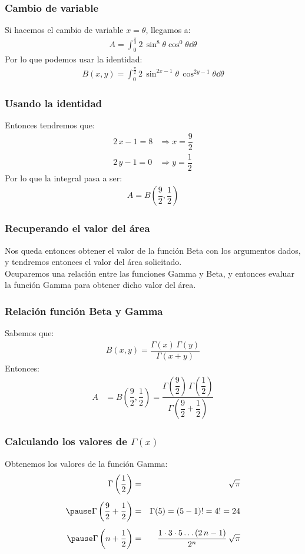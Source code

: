 \begin{frame}
\frametitle{Cambio de variable}
Si hacemos el cambio de variable $x = \theta$, llegamos a:
\begin{align*}
A = \int_{0}^{\frac{\pi}{2}} 2 \, \sin^{8} \theta \cos^{0} \theta \dd{\theta}
\end{align*}
\pause
Por lo que podemos usar la identidad:
\begin{align*}
B(x, y) = \int_{0}^\frac{\pi}{2} 2 \, \sin^{2x-1} \theta \, \cos^{2y-1} \theta \dd{\theta}
\end{align*}
\end{frame}
\begin{frame}
\frametitle{Usando la identidad}
Entonces tendremos que:
\begin{align*}
2 \, x - 1 = 8 &\Rightarrow x = \dfrac{9}{2} \\[0.5em]
2 \, y - 1 = 0 &\Rightarrow y = \dfrac{1}{2}
\end{align*}
\pause
Por lo que la integral pasa a ser:
\begin{align*}
A = B \left( \dfrac{9}{2},\dfrac{1}{2} \right)
\end{align*}
\end{frame}
\begin{frame}
\frametitle{Recuperando el valor del área}
Nos queda entonces obtener el valor de la función Beta con los argumentos dados, y tendremos entonces el valor del área solicitado.
\\
\bigskip
\pause
Ocuparemos una relación entre las funciones Gamma y Beta, y entonces evaluar la función Gamma para obtener dicho valor del área.
\end{frame}
\begin{frame}
\frametitle{Relación función Beta y Gamma}
Sabemos que:
\begin{align*}
B (x, y) = \dfrac{\Gamma (x) \, \Gamma (y)}{\Gamma (x + y)}
\end{align*}
\pause
Entonces:
\begin{align*}
A &= B \left( \dfrac{9}{2},\dfrac{1}{2} \right) = \dfrac{\Gamma \left(\dfrac{9}{2} \right) \, \Gamma \left(\dfrac{1}{2} \right)}{\Gamma \left(\dfrac{9}{2} + \dfrac{1}{2} \right)}
\end{align*}
\end{frame}
\begin{frame}
\frametitle{Calculando los valores de $\Gamma(x)$}
Obtenemos los valores de la función Gamma:
\begin{eqnarray*}
\Gamma \left( \dfrac{1}{2} \right) &=& \sqrt{\pi} \\[0.5em] \pause
\Gamma \left( \dfrac{9}{2} + \dfrac{1}{2} \right) &=& \Gamma (5) = (5 - 1)! = 4! = 24 \\[0.5em] \pause
\Gamma \left(n + \dfrac{1}{2}\right) &=& \dfrac{1 \cdot 3 \cdot 5 \ldots (2 \, n - 1)}{2^{n}} \, \sqrt{\pi} 
\end{eqnarray*}
\end{frame}
